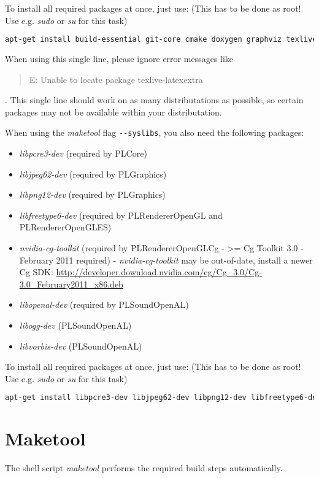 To install all required packages at once, just use: (This has to be done as root! Use e.g. \emph{sudo} or \emph{su} for this task)
\begin{lstlisting}[language=sh]
apt-get install build-essential git-core cmake doxygen graphviz texlive texlive-science texlive-latex-extra texlive-latexextra texlive-latex3 dvipdfm dvipdfmx libncurses5-dev libzip-dev libxcursor-dev libxext-dev libdbus-1-dev libxxf86vm-dev libglu1-mesa-dev libxrandr-dev
\end{lstlisting}
When using this single line, please ignore error messages like \begin{quote}E: Unable to locate package texlive-latexextra\end{quote}. This single line should work on as many distributations as possible, so certain packages may not be available within your distributation.

When using the \emph{maketool} flag \verb+--syslibs+, you also need the following packages:
\begin{itemize}
\item{\emph{libpcre3-dev} (required by PLCore)}
\item{\emph{libjpeg62-dev} (required by PLGraphics)}
\item{\emph{libpng12-dev} (required by PLGraphics)}
\item{\emph{libfreetype6-dev} (required by PLRendererOpenGL and PLRendererOpenGLES)}
\item{\emph{nvidia-cg-toolkit} (required by PLRendererOpenGLCg - >= Cg Toolkit 3.0 - February 2011 required) - \emph{nvidia-cg-toolkit} may be out-of-date, install a newer Cg \ac{SDK}: \url{http://developer.download.nvidia.com/cg/Cg_3.0/Cg-3.0_February2011_x86.deb}}
\item{\emph{libopenal-dev} (required by PLSoundOpenAL)}
\item{\emph{libogg-dev} (PLSoundOpenAL)}
\item{\emph{libvorbis-dev} (PLSoundOpenAL)}
\end{itemize}

To install all required packages at once, just use: (This has to be done as root! Use e.g. \emph{sudo} or \emph{su} for this task)
\begin{lstlisting}[language=sh]
apt-get install libpcre3-dev libjpeg62-dev libpng12-dev libfreetype6-dev libopenal-dev libogg-dev libvorbis-dev
\end{lstlisting}




\section{Maketool}
The shell script \emph{maketool} performs the required build steps automatically.

